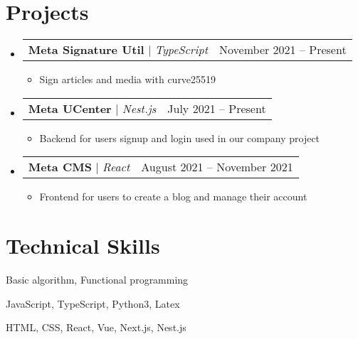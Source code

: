\documentclass[letterpaper,11pt]{article}
\makeatletter
\newcommand{\resumeItem}[1]{
  \item\small{
    {#1 \vspace{-2pt}}
  }
}
\newcommand{\resumeProjectHeading}[2]{
    \item
    \begin{tabular*}{0.97\textwidth}{l@{\extracolsep{\fill}}r}
      \small#1 & #2 \\
    \end{tabular*}\vspace{-7pt}
}
\newcommand{\resumeSubHeadingListStart}{\begin{itemize}[leftmargin=0.15in, label={}]}
\newcommand{\resumeSubHeadingListEnd}{\end{itemize}}
\newcommand{\resumeItemListStart}{\begin{itemize}}
\newcommand{\resumeItemListEnd}{\end{itemize}\vspace{-5pt}}
\makeatother
\begin{document}
\section{Projects}

    \resumeSubHeadingListStart
      \resumeProjectHeading
          {\textbf{Meta Signature Util} $|$ \emph{TypeScript}}{November 2021 -- Present}
          \resumeItemListStart
            \resumeItem{Sign articles and media with curve25519}
          \resumeItemListEnd

      \resumeProjectHeading
          {\textbf{Meta UCenter} $|$ \emph{Nest.js}}{July 2021 -- Present}
          \resumeItemListStart
            \resumeItem{Backend for users signup and login used in our company project}
          \resumeItemListEnd
         
      \resumeProjectHeading
          {\textbf{Meta CMS} $|$ \emph{React}}{August 2021 -- November 2021}
          \resumeItemListStart
            \resumeItem{Frontend for users to create a blog and manage their account }
          \resumeItemListEnd
            
    \resumeSubHeadingListEnd


%
\section{Technical Skills}
 \begin{itemize}[leftmargin=0.15in, label={}]
    \small{
     \item{
     Basic algorithm,
     Functional programming}
     \\
     \item{JavaScript, TypeScript, Python3, Latex} \\
     \item{HTML, CSS, React, Vue, Next.js, Nest.js} \\
    }
 \end{itemize}


\end{document}
